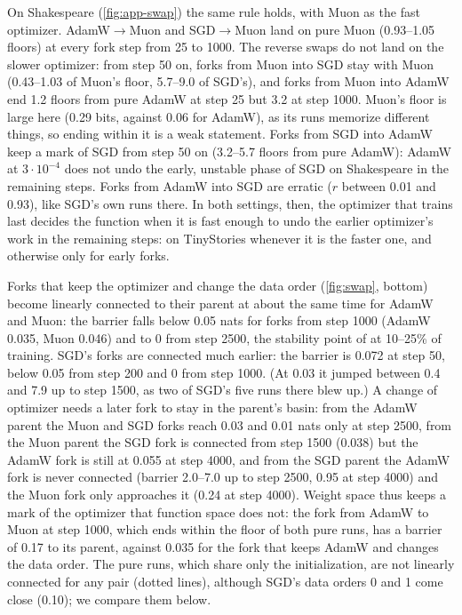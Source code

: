 \documentclass[10pt]{article}
\makeatletter
\renewcommand\paragraph{\@startsection{paragraph}{4}{\z@}{1.2ex \@plus .4ex \@minus .2ex}{-1em}{\normalfont\normalsize\bfseries}}
\makeatother
\begin{document}
On Shakespeare (\cref{fig:app-swap}) the same rule holds, with Muon as the fast optimizer. AdamW$\to$Muon and
SGD$\to$Muon land on pure Muon (0.93--1.05 floors) at every fork step from 25 to 1000. The reverse swaps do not
land on the slower optimizer: from step 50 on, forks from Muon into SGD stay with Muon (0.43--1.03 of Muon's
floor, 5.7--9.0 of SGD's), and forks from Muon into AdamW end 1.2 floors from pure AdamW at step 25 but 3.2 at
step 1000. Muon's floor is large here (0.29 bits, against 0.06 for AdamW), as its runs memorize different
things, so ending within it is a weak statement. Forks from SGD into AdamW keep a mark of SGD from step 50 on
(3.2--5.7 floors from pure AdamW): AdamW at $3\cdot10^{-4}$ does not undo the early, unstable phase of SGD on
Shakespeare in the remaining steps. Forks from AdamW into SGD are erratic ($r$ between 0.01 and 0.93), like
SGD's own runs there. In both settings, then, the optimizer that trains last decides the function when it
is fast enough to undo the earlier optimizer's work in the remaining steps: on TinyStories whenever it is the
faster one, and otherwise only for early forks.

\paragraph{Mode connectivity.} Forks that keep the optimizer and change the data order
(\cref{fig:swap}, bottom) become linearly connected to their parent at about the same time for AdamW and Muon:
the barrier falls below 0.05 nats for forks from step 1000 (AdamW 0.035, Muon 0.046) and to 0 from step 2500,
the stability point of \citet{frankle2020lmc} at 10--25\% of training. SGD's forks are connected much earlier:
the barrier is 0.072 at step 50, below 0.05 from step 200 and 0 from step 1000. (At 0.03 it jumped between 0.4
and 7.9 up to step 1500, as two of SGD's five runs there blew up.) A change of optimizer needs a later
fork to stay in the parent's basin: from the AdamW parent the Muon and SGD forks reach 0.03 and 0.01 nats only at
step 2500, from the Muon parent the SGD fork is connected from step 1500 (0.038) but the AdamW fork is still at
0.055 at step 4000, and from the SGD parent the AdamW fork is never connected (barrier 2.0--7.0 up to step 2500,
0.95 at step 4000) and the Muon fork only approaches it (0.24 at step 4000). Weight space thus keeps a mark of the optimizer that function space does not: the fork from AdamW to Muon
at step 1000, which ends within the floor of both pure runs, has a barrier of 0.17 to its parent, against 0.035
for the fork that keeps AdamW and changes the data order. The pure runs, which share only the initialization, are
not linearly connected for any pair (dotted lines), although SGD's data orders 0 and 1 come close (0.10); we
compare them below.
\end{document}
